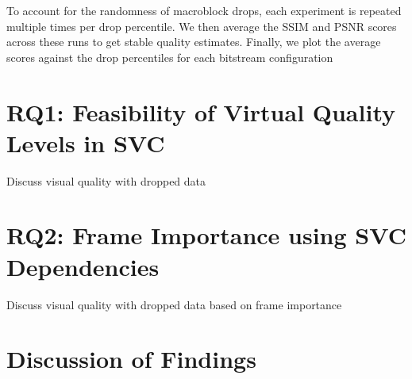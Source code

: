         To account for the randomness of macroblock drops, each experiment is
        repeated multiple times per drop percentile.  We then average the SSIM
        and PSNR scores across these runs to get stable quality estimates. 
        Finally, we plot the average scores against the drop percentiles for
        each bitstream configuration



\section{\textbf{RQ1}: Feasibility of Virtual Quality Levels in SVC}
    Discuss visual quality with dropped data

\section{\textbf{RQ2}: Frame Importance using SVC Dependencies}
    Discuss visual quality with dropped data based on frame importance

\section{Discussion of Findings}